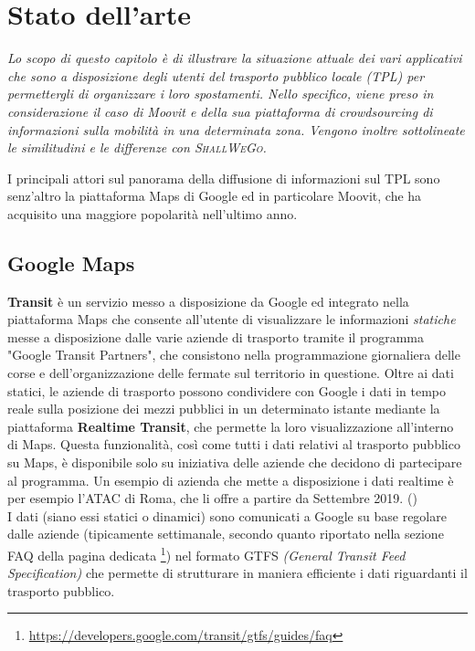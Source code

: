 \chapter{Stato dell'arte} %
%

\begin{citazione}
    \textit{Lo scopo di questo capitolo è di illustrare la situazione attuale dei vari applicativi che sono a disposizione degli utenti del trasporto pubblico locale (TPL) per permettergli di organizzare i loro spostamenti. Nello specifico, viene preso in considerazione il caso di Moovit e della sua piattaforma di crowdsourcing di informazioni sulla mobilità in una determinata zona. Vengono inoltre sottolineate le similitudini e le differenze con \textsc{ShallWeGo}.}
\end{citazione}

\newpage

I principali attori sul panorama della diffusione di informazioni sul TPL sono senz'altro la piattaforma Maps di Google ed in particolare Moovit, che ha acquisito una maggiore popolarità nell'ultimo anno.

\section{Google Maps}
    \textbf{Transit} è un servizio messo a disposizione da Google ed integrato nella piattaforma Maps che consente all'utente di visualizzare le informazioni \textit{statiche} messe a disposizione dalle varie aziende di trasporto tramite il programma "Google Transit Partners", che consistono nella programmazione giornaliera delle corse e dell'organizzazione delle fermate sul territorio in questione. Oltre ai dati statici, le aziende di trasporto possono condividere con Google i dati in tempo reale sulla posizione dei mezzi pubblici in un determinato istante mediante la piattaforma \textbf{Realtime Transit}, che permette la loro visualizzazione all'interno di Maps. Questa funzionalità, così come tutti i dati relativi al trasporto pubblico su Maps, è disponibile solo su iniziativa delle aziende che decidono di partecipare al programma. Un esempio di azienda che mette a disposizione i dati realtime è per esempio l'ATAC di Roma, che li offre a partire da Settembre 2019. (\cite{atactransit})  \\
    I dati (siano essi statici o dinamici) sono comunicati a Google su base regolare dalle aziende (tipicamente settimanale, secondo quanto riportato nella sezione FAQ della pagina dedicata \footnote[2]{\url{https://developers.google.com/transit/gtfs/guides/faq}}) nel formato GTFS \textit{(General Transit Feed Specification)} che permette di strutturare in maniera efficiente i dati riguardanti il trasporto pubblico.

